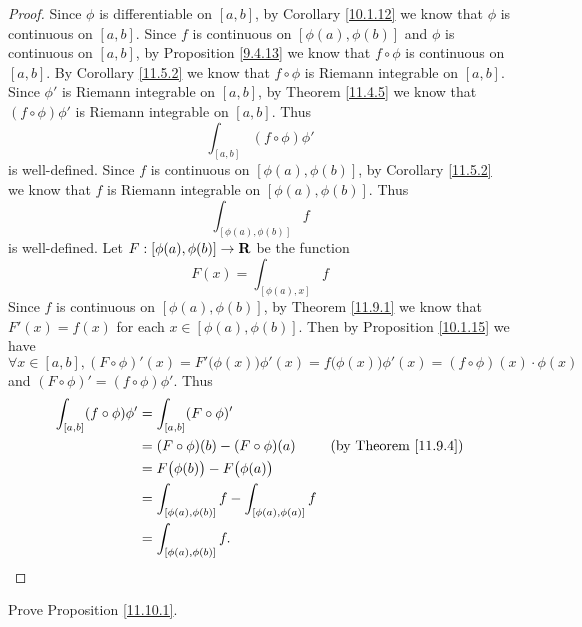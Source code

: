 \begin{proof}
    Since \(\phi\) is differentiable on \([a, b]\), by Corollary \ref{10.1.12} we know that \(\phi\) is continuous on \([a, b]\).
    Since \(f\) is continuous on \([\phi(a), \phi(b)]\) and \(\phi\) is continuous on \([a, b]\), by Proposition \ref{9.4.13} we know that \(f \circ \phi\) is continuous on \([a, b]\).
    By Corollary \ref{11.5.2} we know that \(f \circ \phi\) is Riemann integrable on \([a, b]\).
    Since \(\phi'\) is Riemann integrable on \([a, b]\), by Theorem \ref{11.4.5} we know that \((f \circ \phi) \phi'\) is Riemann integrable on \([a, b]\).
    Thus
    \[
        \int_{[a, b]} (f \circ \phi) \phi'
    \]
    is well-defined.
    Since \(f\) is continuous on \([\phi(a), \phi(b)]\), by Corollary \ref{11.5.2} we know that \(f\) is Riemann integrable on \([\phi(a), \phi(b)]\).
    Thus
    \[
        \int_{[\phi(a), \phi(b)]} f
    \]
    is well-defined.
    Let \(F : [\phi(a), \phi(b)] \to \mathbf{R}\) be the function
    \[
        F(x) = \int_{[\phi(a), x]} f
    \]
    Since \(f\) is continuous on \([\phi(a), \phi(b)]\), by Theorem \ref{11.9.1} we know that \(F'(x) = f(x)\) for each \(x \in [\phi(a), \phi(b)]\).
    Then by Proposition \ref{10.1.15} we have
    \[
        \forall x \in [a, b], (F \circ \phi)'(x) = F'\big(\phi(x)\big) \phi'(x) = f\big(\phi(x)\big) \phi'(x) = (f \circ \phi)(x) \cdot \phi(x)
    \]
    and \((F \circ \phi)' = (f \circ \phi) \phi'\).
    Thus
    \begin{align*}
        \int_{[a, b]} (f \circ \phi) \phi' & = \int_{[a, b]} (F \circ \phi)'                                                                \\
                                           & = (F \circ \phi)(b) - (F \circ \phi)(a)                     & \text{(by Theorem \ref{11.9.4})} \\
                                           & = F\big(\phi(b)\big) - F\big(\phi(a)\big)                                                      \\
                                           & = \int_{[\phi(a), \phi(b)]} f - \int_{[\phi(a), \phi(a)]} f                                    \\
                                           & = \int_{[\phi(a), \phi(b)]} f.
    \end{align*}
\end{proof}

\exercisesection

\begin{exercise}\label{ex 11.10.1}
    Prove Proposition \ref{11.10.1}.
\end{exercise}

